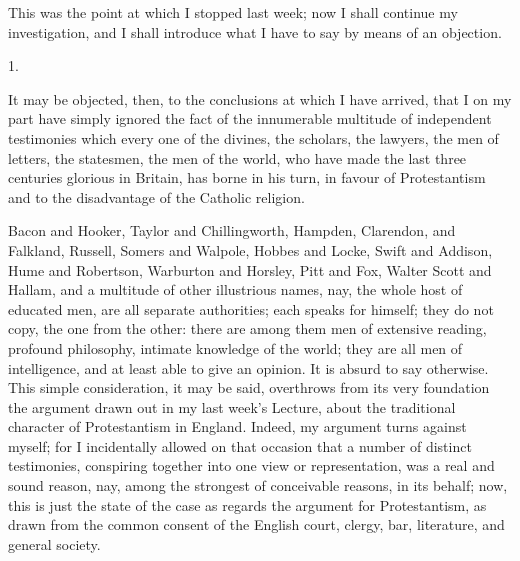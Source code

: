 This was the point at which I stopped last week; now I
shall continue my investigation, and I shall introduce
what I have to say by means of an objection.

1.

It may be objected, then, to the conclusions at which
I have arrived, that I on my part have simply ignored the
fact of the innumerable multitude of independent
testimonies which every one of the divines, the scholars,
the lawyers, the men of letters, the statesmen, the men
of the world, who have made the last three centuries
glorious in Britain, has borne in his turn, in favour of
Protestantism and to the disadvantage of the Catholic
religion.

Bacon and Hooker, Taylor and Chillingworth, Hampden,
Clarendon, and Falkland, Russell, Somers and Walpole,
Hobbes and Locke, Swift and Addison, Hume and Robertson,
Warburton and Horsley, Pitt and Fox, Walter Scott and
Hallam, and a multitude of other illustrious names, nay,
the whole host of educated men, are all separate
authorities; each speaks for himself; they do not copy,
the one from the other: there are among them men of
extensive reading, profound philosophy, intimate
knowledge of the world; they are all men of intelligence,
and at least able to give an opinion. It is absurd to say
otherwise. This simple consideration, it may be said,
overthrows from its very foundation the argument drawn
out in my last week's Lecture, about the traditional
character of Protestantism in England. Indeed, my
argument turns against myself; for I incidentally allowed
on that occasion that a number of distinct testimonies,
conspiring together into one view or representation, was
a real and sound reason, nay, among the strongest of
conceivable reasons, in its behalf; now, this is just the
state of the case as regards the argument for
Protestantism, as drawn from the common consent of the
English court, clergy, bar, literature, and general
society.


